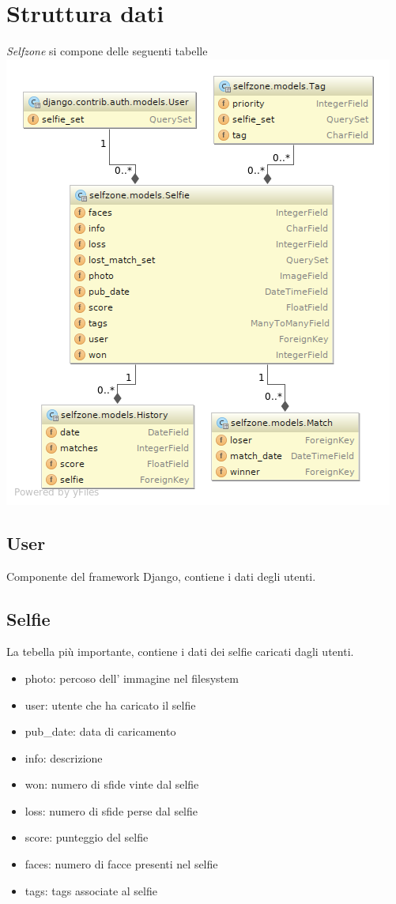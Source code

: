 \documentclass{article}
\newcommand{\proj}{\textit{Selfzone }}
\begin{document}
\section{Struttura dati}
\proj si compone delle seguenti tabelle\\
\includegraphics[width=\textwidth]{res/models_diagram.png}
\clearpage

\subsection{User}
Componente del framework Django, contiene i dati degli utenti.

\subsection{Selfie}
La tebella più importante, contiene i dati dei selfie caricati dagli utenti.
\begin{itemize}
\item photo: percoso dell' immagine nel filesystem
\item user: utente che ha caricato il selfie
\item pub\_date: data di caricamento
\item info: descrizione
\item won: numero di sfide vinte dal selfie
\item loss: numero di sfide perse dal selfie
\item score: punteggio del selfie
\item faces: numero di facce presenti nel selfie
\item tags: tags associate al selfie
\end{itemize}
\end{document}
